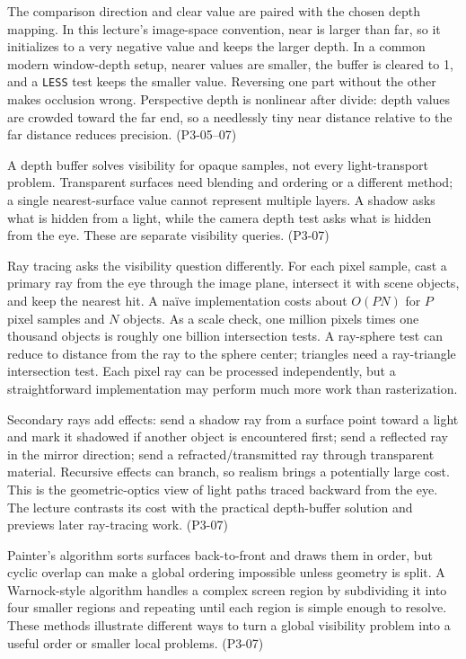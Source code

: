 The comparison direction and clear value are paired with the chosen depth mapping. In this lecture's image-space convention, near is larger than far, so it initializes to a very negative value and keeps the larger depth. In a common modern window-depth setup, nearer values are smaller, the buffer is cleared to 1, and a \texttt{LESS} test keeps the smaller value. Reversing one part without the other makes occlusion wrong. Perspective depth is nonlinear after divide: depth values are crowded toward the far end, so a needlessly tiny near distance relative to the far distance reduces precision. (P3-05--07)

A depth buffer solves visibility for opaque samples, not every light-transport problem. Transparent surfaces need blending and ordering or a different method; a single nearest-surface value cannot represent multiple layers. A shadow asks what is hidden from a light, while the camera depth test asks what is hidden from the eye. These are separate visibility queries. (P3-07)

Ray tracing asks the visibility question differently. For each pixel sample, cast a primary ray from the eye through the image plane, intersect it with scene objects, and keep the nearest hit. A naïve implementation costs about \(O(PN)\) for \(P\) pixel samples and \(N\) objects. As a scale check, one million pixels times one thousand objects is roughly one billion intersection tests. A ray-sphere test can reduce to distance from the ray to the sphere center; triangles need a ray-triangle intersection test. Each pixel ray can be processed independently, but a straightforward implementation may perform much more work than rasterization.

Secondary rays add effects: send a shadow ray from a surface point toward a light and mark it shadowed if another object is encountered first; send a reflected ray in the mirror direction; send a refracted/transmitted ray through transparent material. Recursive effects can branch, so realism brings a potentially large cost. This is the geometric-optics view of light paths traced backward from the eye. The lecture contrasts its cost with the practical depth-buffer solution and previews later ray-tracing work. (P3-07)

Painter's algorithm sorts surfaces back-to-front and draws them in order, but cyclic overlap can make a global ordering impossible unless geometry is split. A Warnock-style algorithm handles a complex screen region by subdividing it into four smaller regions and repeating until each region is simple enough to resolve. These methods illustrate different ways to turn a global visibility problem into a useful order or smaller local problems. (P3-07)

